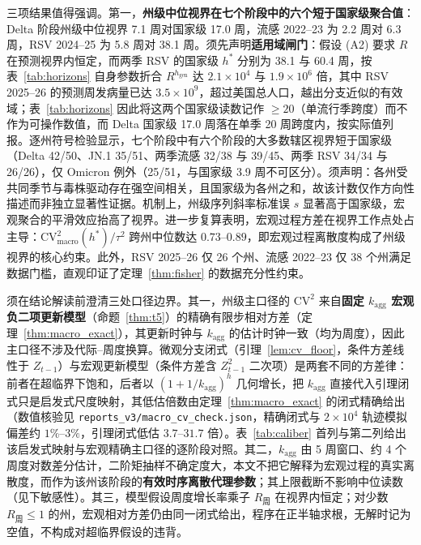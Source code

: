 \documentclass[10pt,a4paper]{article}
\theoremstyle{plain}
\theoremstyle{definition}
\begin{document}
三项结果值得强调。第一，\textbf{州级中位视界在七个阶段中的六个短于国家级聚合值}：Delta 阶段州级中位视界 7.1 周对国家级 17.0 周，流感 2022--23 为 2.2 周对 6.3 周，RSV 2024--25 为 5.8 周对 38.1 周。须先声明\textbf{适用域闸门}：假设 (A2) 要求 $R$ 在预测视界内恒定，而两季 RSV 的国家级 $h^*$ 分别为 38.1 与 60.4 周，按表~\ref{tab:horizons} 自身参数折合 $R^{h_{\text{gen}}}$ 达 $2.1\times10^4$ 与 $1.9\times10^6$ 倍，其中 RSV 2025--26 的预测周发病量已达 $3.5\times10^9$，超过美国总人口，越出分支近似的有效域；表~\ref{tab:horizons} 因此将这两个国家级读数记作 $\ge 20$（单流行季跨度）而不作为可操作数值，而 Delta 国家级 17.0 周落在单季 20 周跨度内，按实际值列报。逐州符号检验显示，七个阶段中有六个阶段的大多数辖区视界短于国家级（Delta 42/50、JN.1 35/51、两季流感 32/38 与 39/45、两季 RSV 34/34 与 26/26），仅 Omicron 例外（25/51，与国家级 3.9 周不可区分）。须声明：各州受共同季节与毒株驱动存在强空间相关，且国家级为各州之和，故该计数仅作方向性描述而非独立显著性证据。机制上，州级序列斜率标准误 $s$ 显著高于国家级，宏观聚合的平滑效应抬高了视界。进一步复算表明，宏观过程方差在视界工作点处占主导：$\text{CV}^2_{\text{macro}}(h^*)/\tau^2$ 跨州中位数达 $0.73$--$0.89$，即宏观过程离散度构成了州级视界的核心约束。此外，RSV 2025--26 仅 26 个州、流感 2022--23 仅 38 个州满足数据门槛，直观印证了定理~\ref{thm:fisher} 的数据充分性约束。

须在结论解读前澄清三处口径边界。其一，州级主口径的 $\text{CV}^2$ 来自\textbf{固定 $k_{\text{agg}}$ 宏观负二项更新模型}（命题~\ref{thm:t5}）的精确有限步相对方差（定理~\ref{thm:macro_exact}），其更新时钟与 $k_{\text{agg}}$ 的估计时钟一致（均为周度），因此主口径不涉及代际--周度换算。微观分支闭式（引理~\ref{lem:cv_floor}，条件方差线性于 $Z_{t-1}$）与宏观更新模型（条件方差含 $Z_{t-1}^2$ 二次项）是两套不同的方差律：前者在超临界下饱和，后者以 $(1+1/k_{\text{agg}})^h$ 几何增长，把 $k_{\text{agg}}$ 直接代入引理闭式只是启发式尺度映射，其低估倍数由定理~\ref{thm:macro_exact} 的闭式精确给出（数值核验见 \texttt{reports\_v3/macro\_cv\_check.json}，精确闭式与 $2\times10^4$ 轨迹模拟偏差约 $1\%$--$3\%$，引理闭式低估 $3.7$--$31.7$ 倍）。表~\ref{tab:caliber} 首列与第二列给出该启发式映射与宏观精确主口径的逐阶段对照。其二，$k_{\text{agg}}$ 由 5 周窗口、约 4 个周度对数差分估计，二阶矩抽样不确定度大，本文不把它解释为宏观过程的真实离散度，而作为该州该阶段的\textbf{有效时序离散代理参数}；其上限截断不影响中位读数（见下敏感性）。其三，模型假设周度增长率乘子 $R_{\text{周}}$ 在视界内恒定；对少数 $R_{\text{周}} \le 1$ 的州，宏观相对方差仍由同一闭式给出，程序在正半轴求根，无解时记为空值，不构成对超临界假设的违背。
\end{document}
